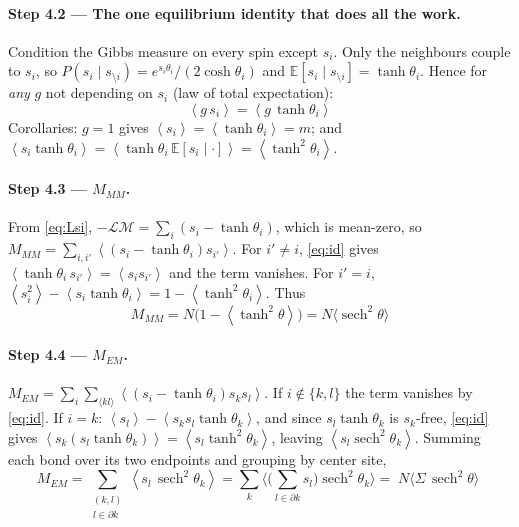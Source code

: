 \documentclass[11pt]{article}
\newcommand{\sech}{\operatorname{sech}}
\newcommand{\mg}{\mathcal{M}}
\newcommand{\LL}{\mathcal{L}}
\newcommand{\avg}[1]{\left\langle #1 \right\rangle}
\newcommand{\Sig}{\Sigma}
\newcommand{\E}{\mathbb{E}}
\begin{document}
\paragraph{Step 4.2 --- The one equilibrium identity that does all the work.}
Condition the Gibbs measure on every spin except $s_i$. Only the neighbours couple to $s_i$, so
$P(s_i\mid s_{\setminus i})=e^{s_i\theta_i}/(2\cosh\theta_i)$ and
$\E[s_i\mid s_{\setminus i}]=\tanh\theta_i$. Hence for \emph{any} $g$ not depending on $s_i$ (law of
total expectation):
\begin{equation}
\boxed{\;\avg{g\,s_i}=\avg{g\,\tanh\theta_i}\;}
\tag{7}\label{eq:id}
\end{equation}
Corollaries: $g=1$ gives $\avg{s_i}=\avg{\tanh\theta_i}=m$; and
$\avg{s_i\tanh\theta_i}=\avg{\tanh\theta_i\,\E[s_i\mid\cdot]}=\avg{\tanh^2\theta_i}$.

\paragraph{Step 4.3 --- $M_{MM}$.}
From \eqref{eq:Lsi}, $-\LL\mg=\sum_i(s_i-\tanh\theta_i)$, which is mean-zero, so
$M_{MM}=\sum_{i,i'}\avg{(s_i-\tanh\theta_i)s_{i'}}$.
For $i'\ne i$, \eqref{eq:id} gives $\avg{\tanh\theta_i\,s_{i'}}=\avg{s_i s_{i'}}$ and the term
vanishes. For $i'=i$, $\avg{s_i^2}-\avg{s_i\tanh\theta_i}=1-\avg{\tanh^2\theta_i}$. Thus
\begin{equation}
\boxed{\;M_{MM}=N\big(1-\avg{\tanh^2\theta}\big)=N\big\langle\sech^2\theta\big\rangle\;}
\end{equation}

\paragraph{Step 4.4 --- $M_{EM}$.}
$M_{EM}=\sum_i\sum_{\langle kl\rangle}\avg{(s_i-\tanh\theta_i)s_ks_l}$. If $i\notin\{k,l\}$ the term
vanishes by \eqref{eq:id}. If $i=k$: $\avg{s_l}-\avg{s_ks_l\tanh\theta_k}$, and since
$s_l\tanh\theta_k$ is $s_k$-free, \eqref{eq:id} gives
$\avg{s_k(s_l\tanh\theta_k)}=\avg{s_l\tanh^2\theta_k}$, leaving
$\avg{s_l\sech^2\theta_k}$. Summing each bond over its two endpoints and grouping by center site,
\begin{equation}
M_{EM}=\sum_{\substack{(k,l)\\ l\in\partial k}}\!\avg{s_l\,\sech^2\theta_k}
=\sum_k\Big\langle\Big(\!\sum_{l\in\partial k}s_l\Big)\sech^2\theta_k\Big\rangle
=\boxed{\;N\big\langle\Sig\,\sech^2\theta\big\rangle\;}
\end{equation}
\end{document}
